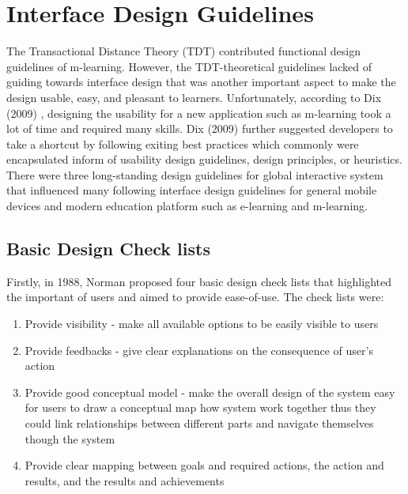 




\section{Interface Design Guidelines}

The Transactional Distance Theory (TDT) contributed functional design guidelines of m-learning. However, the TDT-theoretical guidelines lacked of guiding towards interface design that was another important aspect to make the design usable, easy, and pleasant to learners. Unfortunately, according to Dix (2009) \cite{dix2009human}, designing the usability for a new application such as m-learning took a lot of time and required many skills. Dix (2009) \cite{dix2009human} further suggested developers to take a shortcut by following exiting best practices which commonly were encapsulated inform of usability design guidelines, design principles, or heuristics. There were three long-standing design guidelines for global interactive system that influenced many following interface design guidelines for general mobile devices and modern education platform such as e-learning and m-learning. 

\subsection{Basic Design Check lists} 
Firstly, in 1988, Norman \cite{norman1988psychology} proposed four basic design check lists that highlighted the important of users and aimed to provide ease-of-use. The check lists were: 
\begin{enumerate} 
\item Provide visibility - make all available options to be easily visible to users 
\item Provide feedbacks - give clear explanations on the consequence of user's action 
\item Provide good conceptual model - make the overall design of the system easy for users to draw a conceptual map how system work together thus they could link relationships between different parts and navigate themselves though the system
\item Provide clear mapping between goals and required actions, the action and results, and the results and achievements
\end{enumerate} 

